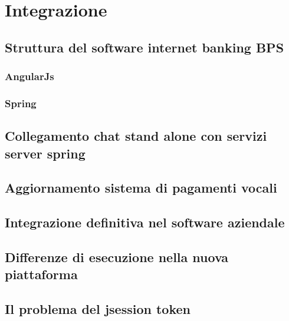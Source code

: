 \chapter{Integrazione}

\section{Struttura del software internet banking BPS}

\subsection{AngularJs}

\subsection{Spring}

\section{Collegamento chat stand alone con servizi server spring}

\section{Aggiornamento sistema di pagamenti vocali}

\section{Integrazione definitiva nel software aziendale}

\section{Differenze di esecuzione nella nuova piattaforma}

\section{Il problema del jsession token}
